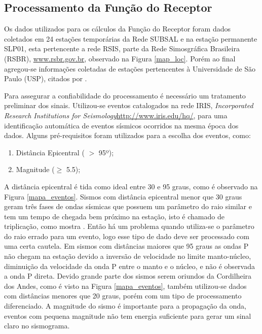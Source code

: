\clearpage
\subsection{Processamento da Função do Receptor}

Os dados utilizados para os cálculos da Função do Receptor foram dados coletados em 24 estações temporárias da Rede SUBSAL e na estação permanente SLP01, esta pertencente a rede RSIS, parte da Rede Simosgráfica Brasileira (RSBR), \url{www.rsbr.gov.br}, observado na Figura \ref{map_loc}. Porém ao final agregou-se informações coletadas de estações pertencentes à Universidade de São Paulo (USP), citados por \cite{Assumpcao_Brazil_2013}. 

Para assegurar a confiabilidade do processamento é necessário um tratamento preliminar dos sinais. Utilizou-se eventos catalogados na rede IRIS, \textit{Incorporated Research Institutions for Seismology}\url{http://www.iris.edu/hq/}, para uma identificação automática de eventos sísmicos ocorridos na mesma época dos dados. Alguns pré-requisitos foram utilizados para a escolha dos eventos, como:

\begin{enumerate}
\item Distância Epicentral ( $>$ 95º);
\item Magnitude ($\geq$ 5.5);
\end{enumerate}

A distância epicentral é tida como ideal entre 30 e 95 graus, como é observado na Figura \ref{mapa_eventos}. Sismos com distância epicentral menor que 30 graus geram três fases de ondas sísmicas que possuem um parâmetro do raio similar e tem um tempo de chegada bem próximo na estação, isto é chamado de triplicação, como mostra \cite{stahler_triplicated_2012}. Então há um problema quando utiliza-se o parâmetro do raio errado para um evento, logo esse tipo de dado deve ser processado com uma certa cautela. Em sismos com distâncias maiores que 95 graus as ondas P não chegam na estação devido a inversão de velocidade no limite manto-núcleo, diminuição da velocidade da onda P entre o manto e o núcleo, e não é observada a onda P direta. Devido grande parte dos sismos serem oriundos da Cordilheira dos Andes, como é visto na Figura \ref{mapa_eventos}, também utilizou-se dados com distâncias menores que 20 graus, porém com um tipo de processamento diferenciado. A magnitude do sismo é importante para a propagação da onda, eventos com pequena magnitude não tem energia suficiente para gerar um sinal claro no sismograma.

